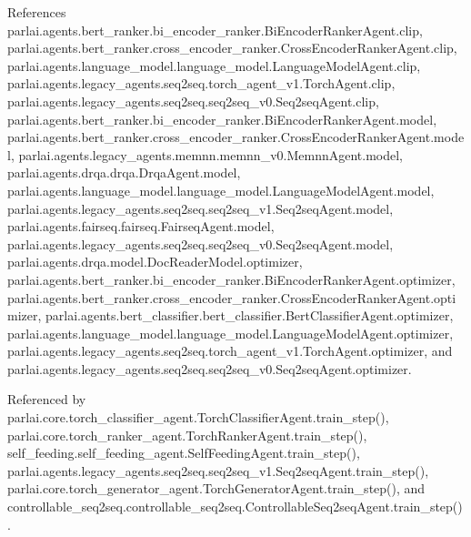 References parlai.\+agents.\+bert\+\_\+ranker.\+bi\+\_\+encoder\+\_\+ranker.\+Bi\+Encoder\+Ranker\+Agent.\+clip, parlai.\+agents.\+bert\+\_\+ranker.\+cross\+\_\+encoder\+\_\+ranker.\+Cross\+Encoder\+Ranker\+Agent.\+clip, parlai.\+agents.\+language\+\_\+model.\+language\+\_\+model.\+Language\+Model\+Agent.\+clip, parlai.\+agents.\+legacy\+\_\+agents.\+seq2seq.\+torch\+\_\+agent\+\_\+v1.\+Torch\+Agent.\+clip, parlai.\+agents.\+legacy\+\_\+agents.\+seq2seq.\+seq2seq\+\_\+v0.\+Seq2seq\+Agent.\+clip, parlai.\+agents.\+bert\+\_\+ranker.\+bi\+\_\+encoder\+\_\+ranker.\+Bi\+Encoder\+Ranker\+Agent.\+model, parlai.\+agents.\+bert\+\_\+ranker.\+cross\+\_\+encoder\+\_\+ranker.\+Cross\+Encoder\+Ranker\+Agent.\+model, parlai.\+agents.\+legacy\+\_\+agents.\+memnn.\+memnn\+\_\+v0.\+Memnn\+Agent.\+model, parlai.\+agents.\+drqa.\+drqa.\+Drqa\+Agent.\+model, parlai.\+agents.\+language\+\_\+model.\+language\+\_\+model.\+Language\+Model\+Agent.\+model, parlai.\+agents.\+legacy\+\_\+agents.\+seq2seq.\+seq2seq\+\_\+v1.\+Seq2seq\+Agent.\+model, parlai.\+agents.\+fairseq.\+fairseq.\+Fairseq\+Agent.\+model, parlai.\+agents.\+legacy\+\_\+agents.\+seq2seq.\+seq2seq\+\_\+v0.\+Seq2seq\+Agent.\+model, parlai.\+agents.\+drqa.\+model.\+Doc\+Reader\+Model.\+optimizer, parlai.\+agents.\+bert\+\_\+ranker.\+bi\+\_\+encoder\+\_\+ranker.\+Bi\+Encoder\+Ranker\+Agent.\+optimizer, parlai.\+agents.\+bert\+\_\+ranker.\+cross\+\_\+encoder\+\_\+ranker.\+Cross\+Encoder\+Ranker\+Agent.\+optimizer, parlai.\+agents.\+bert\+\_\+classifier.\+bert\+\_\+classifier.\+Bert\+Classifier\+Agent.\+optimizer, parlai.\+agents.\+language\+\_\+model.\+language\+\_\+model.\+Language\+Model\+Agent.\+optimizer, parlai.\+agents.\+legacy\+\_\+agents.\+seq2seq.\+torch\+\_\+agent\+\_\+v1.\+Torch\+Agent.\+optimizer, and parlai.\+agents.\+legacy\+\_\+agents.\+seq2seq.\+seq2seq\+\_\+v0.\+Seq2seq\+Agent.\+optimizer.



Referenced by parlai.\+core.\+torch\+\_\+classifier\+\_\+agent.\+Torch\+Classifier\+Agent.\+train\+\_\+step(), parlai.\+core.\+torch\+\_\+ranker\+\_\+agent.\+Torch\+Ranker\+Agent.\+train\+\_\+step(), self\+\_\+feeding.\+self\+\_\+feeding\+\_\+agent.\+Self\+Feeding\+Agent.\+train\+\_\+step(), parlai.\+agents.\+legacy\+\_\+agents.\+seq2seq.\+seq2seq\+\_\+v1.\+Seq2seq\+Agent.\+train\+\_\+step(), parlai.\+core.\+torch\+\_\+generator\+\_\+agent.\+Torch\+Generator\+Agent.\+train\+\_\+step(), and controllable\+\_\+seq2seq.\+controllable\+\_\+seq2seq.\+Controllable\+Seq2seq\+Agent.\+train\+\_\+step().

